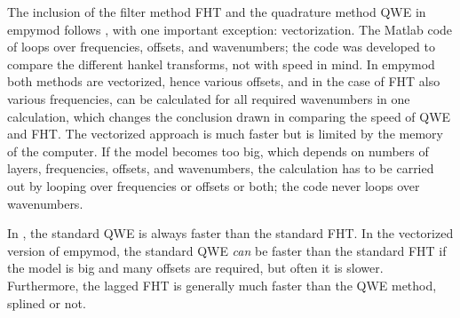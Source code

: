 \documentclass[manuscript,revised]{geophysics}
\begin{document}
The inclusion of the filter method FHT and the quadrature method QWE in empymod
follows \cite{GEO.12.Key}, with one important exception: vectorization. The
Matlab code of \cite{GEO.12.Key} loops over frequencies, offsets, and
wavenumbers; the code was developed to compare the different hankel transforms,
not with speed in mind. In empymod both methods are vectorized, hence various
offsets, and in the case of FHT also various frequencies, can be calculated for
all required wavenumbers in one calculation, which changes the conclusion drawn
in \cite{GEO.12.Key} comparing the speed of QWE and FHT. The vectorized
approach is much faster but is limited by the memory of the computer. If the
model becomes too big, which depends on numbers of layers, frequencies,
offsets, and wavenumbers, the calculation has to be carried out by looping over
frequencies or offsets or both; the code never loops over wavenumbers.

In \cite{GEO.12.Key}, the standard QWE is always faster than the standard FHT.
In the vectorized version of empymod, the standard QWE \emph{can} be faster
than the standard FHT if the model is big and many offsets are required, but
often it is slower. Furthermore, the lagged FHT is generally much faster than
the QWE method, splined or not.
\end{document}
